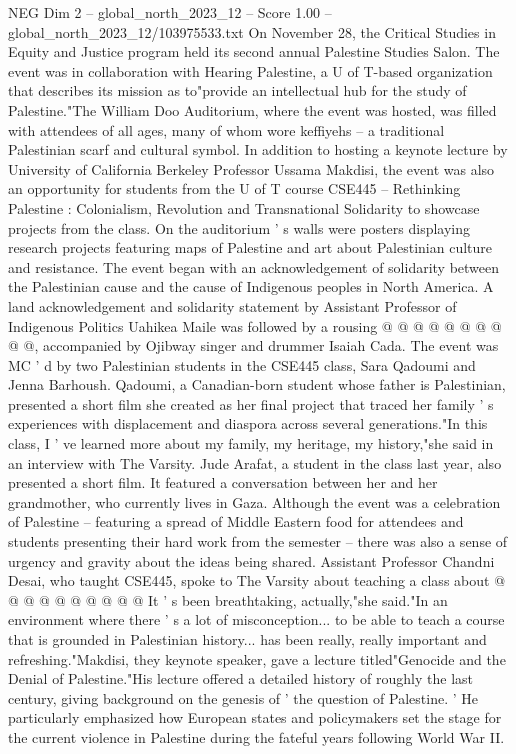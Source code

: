 \begin{textsample}{NEG Dim 2 – global\_north\_2023\_12 – Score 1.00 – global\_north\_2023\_12/103975533.txt}  \label{ex:f2_neg_335}
On November 28, the Critical Studies in Equity and Justice program held its second annual Palestine Studies Salon.
The event was in collaboration with Hearing Palestine, a U of T-based organization that describes its mission as to"provide an intellectual hub for the study of Palestine."The William Doo Auditorium, where the event was hosted, was filled with attendees of all ages, many of whom wore keffiyehs -- a traditional Palestinian scarf and cultural symbol.
In addition to hosting a keynote lecture by University of California Berkeley Professor Ussama Makdisi, the event was also an opportunity for students from the U of T course CSE445 -- Rethinking Palestine : Colonialism, Revolution and Transnational Solidarity to showcase projects from the class.
On the auditorium ' s walls were posters displaying research projects featuring maps of Palestine and art about Palestinian culture and resistance.
The event began with an acknowledgement of solidarity between the Palestinian cause and the cause of Indigenous peoples in North America.
A land acknowledgement and solidarity statement by Assistant Professor of Indigenous Politics Uahikea Maile was followed by a rousing @ @ @ @ @ @ @ @ @ @, accompanied by Ojibway singer and drummer Isaiah Cada.
The event was MC ' d by two Palestinian students in the CSE445 class, Sara Qadoumi and Jenna Barhoush.
Qadoumi, a Canadian-born student whose father is Palestinian, presented a short film she created as her final project that traced her family ' s experiences with displacement and diaspora across several generations."In this class, I ' ve learned more about my family, my heritage, my history,"she said in an interview with The Varsity.
Jude Arafat, a student in the class last year, also presented a short film.
It featured a conversation between her and her grandmother, who currently lives in Gaza.
Although the event was a celebration of Palestine -- featuring a spread of Middle Eastern food for attendees and students presenting their hard work from the semester -- there was also a sense of urgency and gravity about the ideas being shared.
Assistant Professor Chandni Desai, who taught CSE445, spoke to The Varsity about teaching a class about @ @ @ @ @ @ @ @ @ @ It ' s been breathtaking, actually,"she said."In an environment where there ' s a lot of misconception... to be able to teach a course that is grounded in Palestinian history... has been really, really important and refreshing."Makdisi, they keynote speaker, gave a lecture titled"Genocide and the Denial of Palestine."His lecture offered a detailed history of roughly the last century, giving background on the genesis of ' the question of Palestine. ' He particularly emphasized how European states and policymakers set the stage for the current violence in Palestine during the fateful years following World War II.

\end{textsample}
